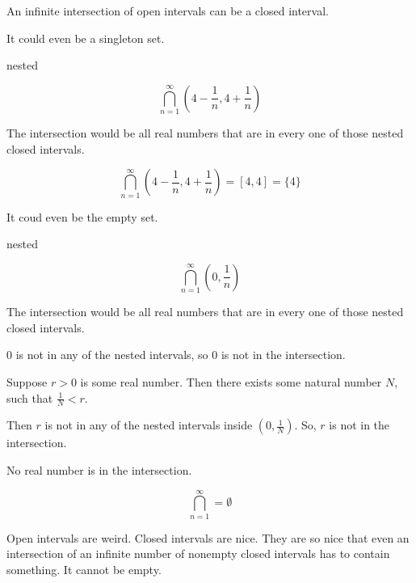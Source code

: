 \documentclass{ximera}
\begin{document}
An infinite intersection of open intervals can be a closed interval.


It could even be a singleton set.




\begin{example} nested


\[ \bigcap_{n=1}^{\infty}   \left(4 - \frac{1}{n}, 4 +  \frac{1}{n}\right)     \]



The intersection would be all real numbers that are in every one of those nested closed intervals.


\[ \bigcap_{n=1}^{\infty}   \left(4 -  \frac{1}{n}, 4 + \frac{1}{n}\right)    = [4, 4] = \{ 4 \}   \]





\end{example}





It coud even be the empty set.



\begin{example} nested


\[ \bigcap_{n=1}^{\infty}   \left(0,  \frac{1}{n}\right)     \]



The intersection would be all real numbers that are in every one of those nested closed intervals.


$0$ is not in any of the nested intervals, so $0$ is not in the intersection.


Suppose $r>0$ is some real number.  Then there exists some natural number $N$, such that $\frac{1}{N} < r$.

Then $r$ is not in any of the nested intervals inside $\left(0,  \frac{1}{N}\right)$. So, $r$ is not in the intersection.


No real number is in the intersection.


\[ \bigcap_{n=1}^{\infty}   = \emptyset    \]



\end{example}










Open intervals are weird.  Closed intervals are nice.  They are so nice that even an intersection of an infinite number of nonempty closed intervals has to contain something.  It cannot be empty.
\end{document}
